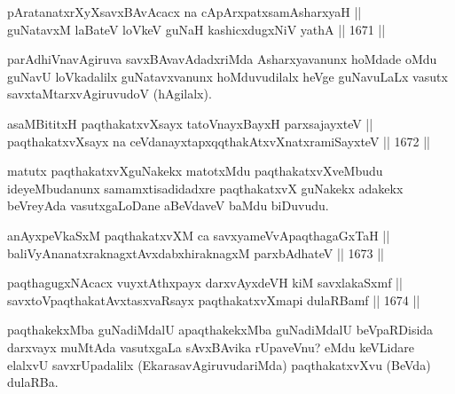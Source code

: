
\begin{shl}
pAratanatxrXyXsavxBAvAcacx na cApArxpatxsamAsharxyaH || \\
guNatavxM laBateV loVkeV guNaH kashicxdugxNiV yathA \hfill || 1671 ||  
\end{shl}

\begin{artha}
parAdhiVnavAgiruva savxBAvavAdadxriMda Asharxyavanunx hoMdade oMdu guNavU loVkadalilx guNatavxvanunx hoMduvudilalx heVge guNavuLaLx vasutx savxtaMtarxvAgiruvudoV (hAgilalx).
\end{artha}

\begin{shl}
asaMBititxH paqthakatxvXsayx tatoV\s nayxBayxH parxsajayxteV ||  \\
paqthakatxvXsayx na ceVdanayxtapxqqthakAtxvXnatxramiSayxteV \hfill || 1672 ||  
\end{shl}

\begin{artha}
matutx paqthakatxvXguNakekx matotxMdu paqthakatxvXveMbudu ideyeMbudanunx samamxtisadidadxre paqthakatxvX guNakekx adakekx beVreyAda vasutxgaLoDane aBeVdaveV baMdu biDuvudu.
\end{artha}

\begin{shl}
anAyxpeVkaSxM paqthakatxvXM ca savxyameVvApaqthagaGxTaH || \\
baliVyAnanatxraknagxtAvxdabxhiraknagxM parxbAdhateV \hfill || 1673 ||  
\end{shl}



\begin{shl}
paqthagugxNAcacx vuyxtAthxpayx darxvAyxdeVH kiM savxlakaSxmf ||  \\
savxtoV\s paqthakatAvxtasxvaRsayx paqthakatxvXmapi dulaRBamf \hfill || 1674 ||  
\end{shl}

\begin{artha}
paqthakekxMba guNadiMdalU apaqthakekxMba guNadiMdalU beVpaRDisida darxvayx muMtAda vasutxgaLa sAvxBAvika rUpaveVnu? eMdu keVLidare elalxvU savxrUpadalilx (EkarasavAgiruvudariMda) paqthakatxvXvu (BeVda) dulaRBa.
\end{artha}

